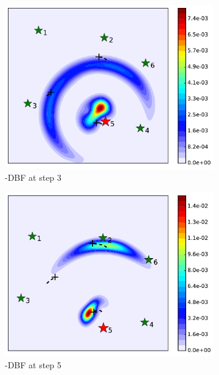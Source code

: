 			
	\begin{figure}%
		\centering		
		\begin{subfigure}[b]{0.23\textwidth}
			\includegraphics[width=\textwidth]{figures/dbf_hetero_mov_sen_mov_tar_rbt5_step3}
			\caption{\proto-DBF at step 3}\label{fig:step3}
		\end{subfigure}
		\begin{subfigure}[b]{0.23\textwidth}
			\includegraphics[width=\textwidth]{figures/dbf_hetero_mov_sen_mov_tar_rbt5_step5}
			\caption{\proto-DBF at step 5}\label{fig:step5}
		\end{subfigure}
		\begin{subfigure}[b]{0.23\textwidth}

\end{subfigure}
\end{figure}
